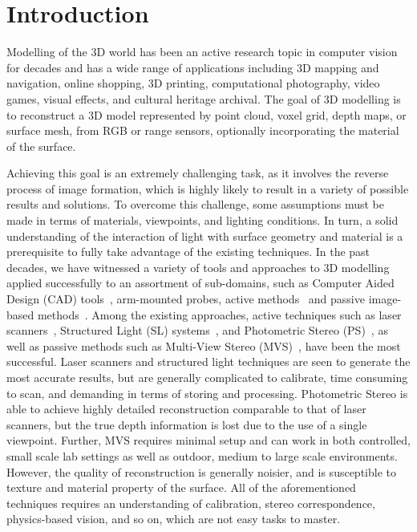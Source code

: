 
\chapter{Introduction}
\label{ch:Introduction}
Modelling of the 3D world has been an active research topic in computer vision for decades and has a wide range of applications including 3D mapping and navigation, online shopping, 3D printing, computational photography, video games, visual effects, and cultural heritage archival. The goal of 3D modelling is to reconstruct a 3D model represented by point cloud, voxel grid, depth maps, or surface mesh, from RGB or range sensors, optionally incorporating the material of the surface.

Achieving this goal is an extremely challenging task, as it involves the reverse process of image formation, which is highly likely to result in a variety of possible results and solutions. To overcome this challenge, some assumptions must be made in terms of materials, viewpoints, and lighting conditions. In turn, a solid understanding of the interaction of light with surface geometry and material is a prerequisite to fully take advantage of the existing techniques. In the past decades, we have witnessed a variety of tools and approaches to 3D modelling applied successfully to an assortment of sub-domains, such as Computer Aided Design (CAD) tools~\cite{CAD}, arm-mounted probes, active methods~\cite{bernardini2002building,levoy2000digital,Lidar,kinect} and passive image-based methods~\cite{kutulakos2000theory,furukawa2010accurate,faugeras2002variational,goesele2006multi}. Among the existing approaches, active techniques such as laser scanners~\cite{levoy2000digital}, Structured Light (SL) systems~\cite{bernardini2002building}, and Photometric Stereo (PS)~\cite{woodham1980photometric}, as well as passive methods such as Multi-View Stereo (MVS)~\cite{seitz2006comparison}, have been the most successful. Laser scanners and structured light techniques are seen to generate the most accurate results, but are generally complicated to calibrate, time consuming to scan, and demanding in terms of storing and processing. Photometric Stereo is able to achieve highly detailed reconstruction comparable to that of laser scanners, but the true depth information is lost due to the use of a single viewpoint. Further, MVS requires minimal setup and can work in both controlled, small scale lab settings as well as outdoor, medium to large scale environments. However, the quality of reconstruction is generally noisier, and is susceptible to texture and material property of the surface. All of the aforementioned techniques requires an understanding of calibration, stereo correspondence, physics-based vision, and so on, which are not easy tasks to master.


